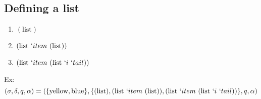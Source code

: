\documentclass[11pt,a4paper]{report}
\newcommand{\var}[1]{`#1}
\begin{document}
\subsection{Defining a list}

\begin{enumerate}
\item $(\text{list})$
\item $(\text{list}\ \var{item}\ (\text{list}))$
\item $(\text{list}\ \var{item}\ (\text{list}\ \var{i}\ \var{tail}))$
\end{enumerate}

Ex:
\[
    (\sigma, \delta, q, \alpha ) = (\{\text{yellow}, \text{blue}\}, 
    \{
(\text{list}),
(\text{list}\ \var{item}\ (\text{list})),
(\text{list}\ \var{item}\ (\text{list}\ \var{i}\ \var{tail}))
    \}, q, \alpha)
\]
\end{document}
